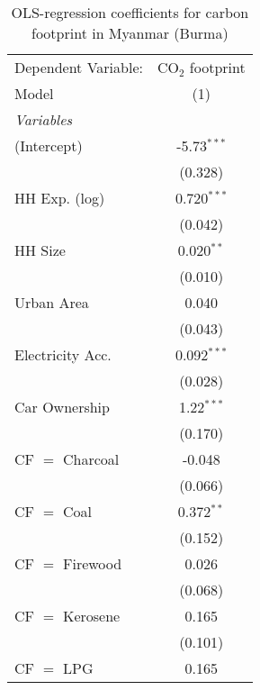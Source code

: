 
\begin{table}[htbp!]
   \centering
   \small
   \begin{adjustbox}{width = 1\textwidth, max height = 0.95\textheight, center}
      \begin{threeparttable}[b]
         \caption{\label{tab:OLS_2_MMR} OLS-regression coefficients for carbon footprint in Myanmar (Burma)}
         \begin{tabular}{lc}
            \tabularnewline \midrule \midrule
            Dependent Variable: & CO$_{2}$ footprint\\  
            Model               & (1)\\  
            \midrule
            \emph{Variables}\\
            (Intercept)         & -5.73$^{***}$\\   
                                & (0.328)\\   
            HH Exp. (log)       & 0.720$^{***}$\\   
                                & (0.042)\\   
            HH Size             & 0.020$^{**}$\\   
                                & (0.010)\\   
            Urban Area          & 0.040\\   
                                & (0.043)\\   
            Electricity Acc.    & 0.092$^{***}$\\   
                                & (0.028)\\   
            Car Ownership       & 1.22$^{***}$\\   
                                & (0.170)\\   
            CF $=$ Charcoal     & -0.048\\   
                                & (0.066)\\   
            CF $=$ Coal         & 0.372$^{**}$\\   
                                & (0.152)\\   
            CF $=$ Firewood     & 0.026\\   
                                & (0.068)\\   
            CF $=$ Kerosene     & 0.165\\   
                                & (0.101)\\   
            CF $=$ LPG          & 0.165\\   

\end{tabular}
\end{threeparttable}
\end{adjustbox}
\end{table}
